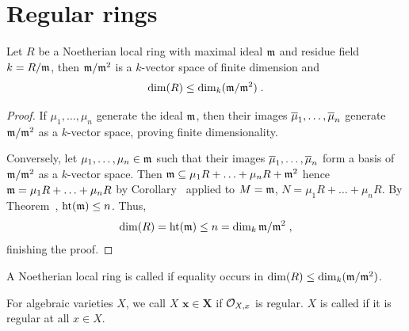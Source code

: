 \documentclass[a4paper,parskip=half,numbers=enddot, DIV=12]{scrreprt}
\begin{document}
\section{Regular rings}
\begin{prop}
    Let $R$ be a Noetherian local ring with maximal ideal $\mathfrak{m}$ and residue field $k=R/\mathfrak{m}$, then $\mathfrak{m}/\mathfrak{m}^2$ is a $k$-vector space of finite dimension and 
    \begin{align*}
    	\dim(R) \leq \dim_k(\mathfrak{m}/\mathfrak{m}^2)\;.
    \end{align*}
\end{prop}
\begin{proof}
    If $\mu_1,\ldots,\mu_n$ generate the ideal $\mathfrak{m}$, then their images $\overline{\mu}_1,\ldots,\overline{\mu}_n$ generate $\mathfrak{m}/\mathfrak{m}^2$ as a $k$-vector space, proving finite dimensionality. 
    
    Conversely, let $\mu_1,\ldots,\mu_n\in\mathfrak{m}$ such that their images $\overline{\mu}_1,\ldots,\overline{\mu}_n$ form a basis of $\mathfrak{m}/\mathfrak{m}^2$ as a $k$-vector space. Then $\mathfrak{m} \subseteq \mu_1R+\ldots+\mu_nR+\mathfrak{m}^2$ hence $\mathfrak{m} = \mu_1R+\ldots+\mu_nR$ by Corollary~ applied to $M = \mathfrak{m}$, $N = \mu_1R+\ldots+\mu_nR$. By Theorem~, $\operatorname{ht}(\mathfrak{m}) \leq n$. Thus,
    \begin{align*}
    	\dim (R) = \operatorname{ht}(\mathfrak{m}) \leq n = \dim_k \mathfrak{m}/\mathfrak{m}^2\;,
    \end{align*}
    finishing the proof.
\end{proof}
\begin{defi}[Regularity]
	\begin{alphanumerate}
		\item A Noetherian local ring is called  if equality occurs in $\dim (R) \leq\dim_k(\mathfrak{m}/\mathfrak{m}^2)$. 
		\item For algebraic varieties $X$, we call $X$  $\boldsymbol{x\in X}$ if $\mathcal{O}_{X,x}$ is regular. $X$ is called  if it is regular at all $x\in X$.
	\end{alphanumerate}
\end{defi}
\end{document}
